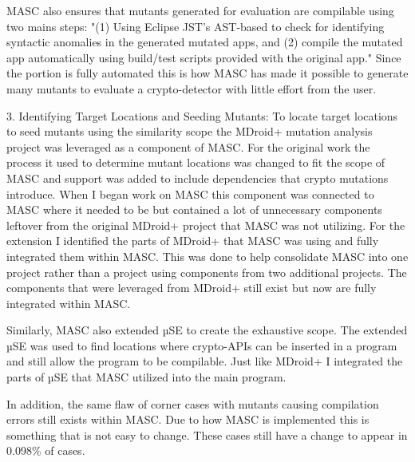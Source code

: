 MASC also ensures that mutants generated for evaluation are compilable using two mains steps: "(1) Using Eclipse JST's AST-based to check for identifying syntactic anomalies in the generated mutated apps, and (2) compile the mutated app automatically using build/test scripts provided with the original app." Since the portion is fully automated this is how MASC has made it possible to generate many mutants to evaluate a crypto-detector with little effort from the user.

3. Identifying Target Locations and Seeding Mutants: To locate target locations to seed mutants using the similarity scope the MDroid+ mutation analysis project was leveraged as a component of MASC. For the original work the process it used to determine mutant locations was changed to fit the scope of MASC and support was added to include dependencies that crypto mutations introduce. When I began work on MASC this component was connected to MASC where it needed to be but contained a lot of unnecessary components leftover from the original MDroid+ project that MASC was not utilizing. For the extension I identified the parts of MDroid+ that MASC was using and fully integrated them within MASC. This was done to help consolidate MASC into one project rather than a project using components from two additional projects. The components that were leveraged from MDroid+ still exist but now are fully integrated within MASC.

Similarly, MASC also extended µSE to create the exhaustive scope. The extended µSE was used to find locations where crypto-APIs can be inserted in a program and still allow the program to be compilable. Just like MDroid+ I integrated the parts of µSE that MASC utilized into the main program. 

In addition, the same flaw of corner cases with mutants causing compilation errors still exists within MASC. Due to how MASC is implemented this is something that is not easy to change. These cases still have a change to appear in 0.098\% of cases.

